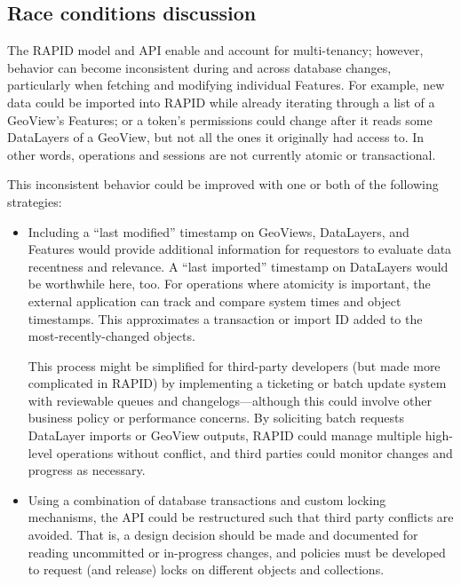 \subsection{Race conditions discussion}
The RAPID model and API enable and account for multi-tenancy; however, behavior can become inconsistent during and across database changes, particularly when fetching and modifying individual Features. For example, new data could be imported into RAPID while already iterating through a list of a GeoView's Features; or a token's permissions could change after it reads some DataLayers of a GeoView, but not all the ones it originally had access to. In other words, operations and sessions are not currently atomic or transactional.

This inconsistent behavior could be improved with one or both of the following strategies:

\begin{itemize}
\item Including a ``last modified'' timestamp on GeoViews, DataLayers, and Features would provide additional information for requestors to evaluate data recentness and relevance. A ``last imported'' timestamp on DataLayers would be worthwhile here, too. For operations where atomicity is important, the external application can track and compare system times and object timestamps. This approximates a transaction or import ID added to the most-recently-changed objects.

This process might be simplified for third-party developers (but made more complicated in RAPID) by implementing a ticketing or batch update system with reviewable queues and changelogs---although this could involve other business policy or performance concerns. By soliciting batch requests DataLayer imports or GeoView outputs, RAPID could manage multiple high-level operations without conflict, and third parties could monitor changes and progress as necessary.

\item Using a combination of database transactions and custom locking mechanisms, the API could be restructured such that third party conflicts are avoided. That is, a design decision should be made and documented for reading uncommitted or in-progress changes, and policies must be developed to request (and release) locks on different objects and collections.
\end{itemize}

\label{design_srid}
